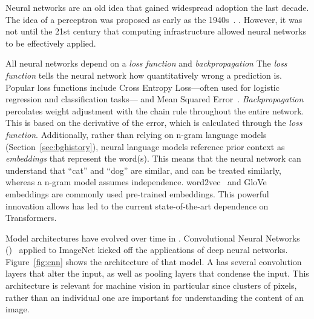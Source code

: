 Neural networks are an old idea that gained widespread adoption the last decade.  
%
The idea of a perceptron was proposed as early as the 1940s~\citep{mcculloch1943logical, rosenblatt1958perceptron}.  
%
.
%
However, it was not until the 21st century that computing infrastructure allowed neural networks to be effectively applied.  

All neural networks depend on a \textit{loss function} and \textit{backpropagation} 
%
The \textit{loss function} tells the neural network how quantitatively wrong a prediction is.  
%
Popular loss functions include Cross Entropy Loss---often used for logistic regression and classification tasks--- and Mean Squared Error~\citep{meansquarederror}.  
%
\textit{Backpropagation } percolates weight adjustment with the chain rule throughout the entire network.
%
This is based on the derivative of the error, which is calculated through the \textit{loss function}.    
%
Additionally, rather than relying on n-gram language models (Section~\ref{sec:bghistory}), neural language models reference prior context as \textit{embeddings} that represent the word(s). 
%
This means that the neural network can understand that ``cat'' and ``dog'' are similar, and can be treated similarly, whereas a n-gram model assumes independence.  
%
word2vec~\citep{mikolov2013distributed2} and GloVe~\citep{pennington2014glove} embeddings are commonly used pre-trained embeddings.  
%
This powerful innovation allows has led to the current state-of-the-art dependence on Transformers.

\begin{figure*}[]
	\centering
	\texttt{[image: \\figfile\{CNN\_Architecture.pdf]}}
	\caption{~\citet{krizhevsky2012imagenet}'s \abr{cnn} architecture.}
	\label{fig:cnn}
\end{figure*}


Model architectures have evolved over time in \nlp{}.
%
Convolutional Neural Networks ()~\citep{krizhevsky2012imagenet} applied to ImageNet kicked off the applications of deep neural networks.  
%
Figure~\ref{fig:cnn} shows the architecture of that model.  
%
A  has several convolution layers that alter the input, as well as pooling layers that condense the input.  
%
This architecture is relevant for machine vision in particular since clusters of pixels, rather than an individual one are important for understanding the content of an image.  
% 

